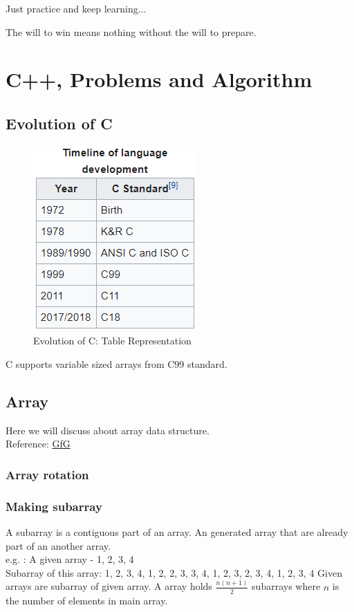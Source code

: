 \documentclass[10 pt]{book}
\begin{document}
\begin{tcolorbox}[width=7cm]
	Just practice and keep learning...
\end{tcolorbox}

\begin{flushright}
	\begin{tcolorbox}[title={Juma Ikangaa, marathoner}, colback=red!5!white, colframe=red!75!black, fonttitle=\bfseries]
		The will to win means nothing without the will to prepare.
	\end{tcolorbox}
\end{flushright}

\chapter{C++, Problems and Algorithm}
\section{Evolution of C}
\begin{figure}[hbtp]
\centering
\includegraphics[width=200 px]{Timeline of C language.png}
\caption{Evolution of C: Table Representation}
\end{figure}
C supports variable sized arrays from C99 standard.

\section{Array}
Here we will discuss about array data structure.\\
Reference: \href{https://www.geeksforgeeks.org/array-data-structure/}{GfG}\\

\subsection{Array rotation}
\subsection{Making subarray}
A subarray is a contiguous part of an array. An generated array that are already part of an another array.\\
e.g. : A given array - {1, 2, 3, 4}\\
Subarray of this array:
{1}, {2}, {3}, {4}, {1, 2}, {2, 3}, {3, 4}, {1, 2, 3}, {2, 3, 4}, {1, 2, 3, 4}
Given arrays are subarray of given array. A array holds $\frac{n(n+1)}{2}$ subarrays where $n$ is the number of elements in main array.
\end{document}
